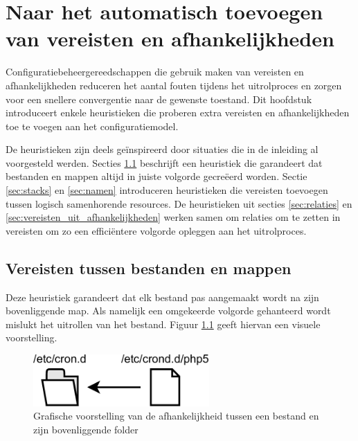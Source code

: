 
\chapter{Naar het automatisch toevoegen van vereisten en afhankelijkheden}
\label{sec:afhankelijkheden}
Configuratiebeheergereedschappen die gebruik maken van vereisten en afhankelijkheden reduceren het aantal fouten tijdens het uitrolproces en zorgen voor een snellere convergentie naar de gewenste toestand.
Dit hoofdstuk introduceert enkele heuristieken die proberen extra vereisten en afhankelijkheden toe te voegen aan het configuratiemodel.

De heuristieken zijn deels ge\"inspireerd door situaties die in de inleiding al voorgesteld werden. 
Secties \ref{sec:bestanden_en_mappen} beschrijft een heuristiek die garandeert dat bestanden en mappen altijd in juiste volgorde gecre\"eerd worden.
Sectie \ref{sec:stacks} en \ref{sec:namen} introduceren heuristieken die vereisten toevoegen tussen logisch samenhorende resources.
De heuristieken uit secties \ref{sec:relaties} en \ref{sec:vereisten_uit_afhankelijkheden} werken samen om relaties om te zetten in vereisten om zo een effici\"entere volgorde opleggen aan het uitrolproces.  

\section{Vereisten tussen bestanden en mappen}
\label{sec:bestanden_en_mappen}
Deze heuristiek garandeert dat elk bestand pas aangemaakt wordt na zijn bovenliggende map.
Als namelijk een omgekeerde volgorde gehanteerd wordt mislukt het uitrollen van het bestand.
Figuur \ref{fig:file_dir_dep} geeft hiervan een visuele voorstelling.

\begin{figure}
    \begin{center}
    \includegraphics[width=0.6\textwidth]{images/file_dir_dep.pdf}
    \caption{Grafische voorstelling van de afhankelijkheid tussen een bestand en zijn bovenliggende folder}
    \label{fig:file_dir_dep}
    \end{center}
\end{figure}


